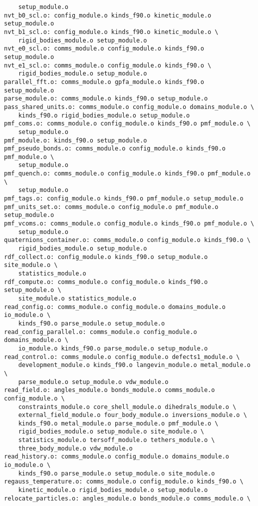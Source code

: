 \begin{verbatim}
	setup_module.o
nvt_b0_scl.o: config_module.o kinds_f90.o kinetic_module.o setup_module.o
nvt_b1_scl.o: config_module.o kinds_f90.o kinetic_module.o \
	rigid_bodies_module.o setup_module.o
nvt_e0_scl.o: comms_module.o config_module.o kinds_f90.o setup_module.o
nvt_e1_scl.o: comms_module.o config_module.o kinds_f90.o \
	rigid_bodies_module.o setup_module.o
parallel_fft.o: comms_module.o gpfa_module.o kinds_f90.o setup_module.o
parse_module.o: comms_module.o kinds_f90.o setup_module.o
pass_shared_units.o: comms_module.o config_module.o domains_module.o \
	kinds_f90.o rigid_bodies_module.o setup_module.o
pmf_coms.o: comms_module.o config_module.o kinds_f90.o pmf_module.o \
	setup_module.o
pmf_module.o: kinds_f90.o setup_module.o
pmf_pseudo_bonds.o: comms_module.o config_module.o kinds_f90.o pmf_module.o \
	setup_module.o
pmf_quench.o: comms_module.o config_module.o kinds_f90.o pmf_module.o \
	setup_module.o
pmf_tags.o: config_module.o kinds_f90.o pmf_module.o setup_module.o
pmf_units_set.o: comms_module.o config_module.o pmf_module.o setup_module.o
pmf_vcoms.o: comms_module.o config_module.o kinds_f90.o pmf_module.o \
	setup_module.o
quaternions_container.o: comms_module.o config_module.o kinds_f90.o \
	rigid_bodies_module.o setup_module.o
rdf_collect.o: config_module.o kinds_f90.o setup_module.o site_module.o \
	statistics_module.o
rdf_compute.o: comms_module.o config_module.o kinds_f90.o setup_module.o \
	site_module.o statistics_module.o
read_config.o: comms_module.o config_module.o domains_module.o io_module.o \
	kinds_f90.o parse_module.o setup_module.o
read_config_parallel.o: comms_module.o config_module.o domains_module.o \
	io_module.o kinds_f90.o parse_module.o setup_module.o
read_control.o: comms_module.o config_module.o defects1_module.o \
	development_module.o kinds_f90.o langevin_module.o metal_module.o \
	parse_module.o setup_module.o vdw_module.o
read_field.o: angles_module.o bonds_module.o comms_module.o config_module.o \
	constraints_module.o core_shell_module.o dihedrals_module.o \
	external_field_module.o four_body_module.o inversions_module.o \
	kinds_f90.o metal_module.o parse_module.o pmf_module.o \
	rigid_bodies_module.o setup_module.o site_module.o \
	statistics_module.o tersoff_module.o tethers_module.o \
	three_body_module.o vdw_module.o
read_history.o: comms_module.o config_module.o domains_module.o io_module.o \
	kinds_f90.o parse_module.o setup_module.o site_module.o
regauss_temperature.o: comms_module.o config_module.o kinds_f90.o \
	kinetic_module.o rigid_bodies_module.o setup_module.o
relocate_particles.o: angles_module.o bonds_module.o comms_module.o \

\end{verbatim}
